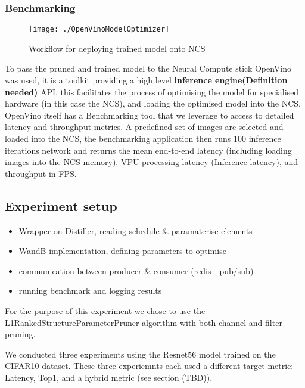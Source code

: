 \documentclass[../Dissertation.tex]{subfiles}
\begin{document}
\subsubsection{Benchmarking}

\begin{figure}[H]
	\centering
	\texttt{[image: ./OpenVinoModelOptimizer]}
	\caption{Workflow for deploying trained model onto NCS \autocite{ModelOptimizerDeveloper}}
	\label{fig:OpenVinoWorkflow}
\end{figure}


To pass the pruned and trained model to the Neural Compute stick OpenVino was used, it is a toolkit providing a high level \textbf{inference engine(Definition needed)} API, this facilitates the process of optimising the model for specialised hardware (in this case the NCS), and loading the optimised model into the NCS. 
OpenVino itself has a Benchmarking tool that we leverage to access to detailed latency and throughput metrics. A predefined set of images are selected and loaded into the NCS, the benchmarking application then runs 100 inference iterations network and returns the mean end-to-end latency (including loading images into the NCS memory), VPU processing latency (Inference latency), and throughput in FPS.

\subsection{Experiment setup}
\begin{itemize}
    \item Wrapper on Distiller, reading schedule \& paramaterise elements
    \item WandB implementation, defining parameters to optimise
    \item communication between producer \& consumer (redis - pub/sub)
    \item running benchmark and logging results
\end{itemize}

For the purpose of this experiment we chose to use the L1RankedStructureParameterPruner algorithm with both channel and filter pruning.

We conducted three experiments using the Resnet56 model trained on the CIFAR10 dataset. 
These three experiemnts each used a different target metric: Latency, Top1, and a hybrid metric (see section (TBD)).
\end{document}
